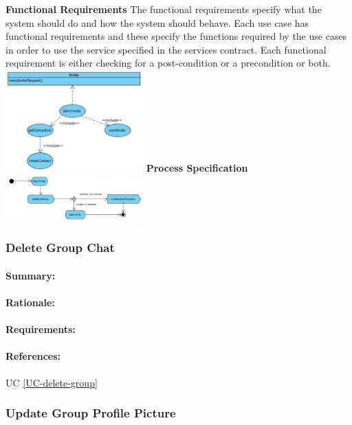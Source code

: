 \documentclass[11pt]{article}
\begin{document}
\textbf{Functional Requirements}\newline
 The functional requirements specify what the system should do and how the system should behave. Each use case has functional requirements and these specify the functions required by the use cases in order to use the service specified in the services contract. Each functional requirement is either checking for a post-condition or a precondition or both.\newline
 \newline
\includegraphics[width=200px]{./images/FR-sendInvite.jpg}
 \newline
\textbf{Process Specification} \newline
 \newline
 \includegraphics[width=200px]{./images/process-sendInvite.jpg}
  \newline
 
\subsubsection{Delete Group Chat} \label{FR-delete-group}
\paragraph{Summary:}
\paragraph{Rationale:}
\paragraph{Requirements:}
\paragraph{References:} UC \ref{UC-delete-group}
\subsubsection{Update Group Profile Picture} \label{FR-update-group-picture}
\end{document}
